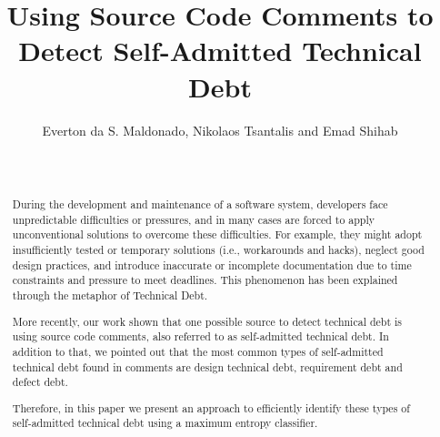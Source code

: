 \documentclass{sig-alternate}
\begin{document}

\title{Using Source Code Comments to Detect Self-Admitted Technical Debt}

\author{
\alignauthor 
       Everton da S. Maldonado, Nikolaos Tsantalis and Emad Shihab\\
       \\
       \\
}


\maketitle
\begin{abstract}
During the development and maintenance of a software system, developers face unpredictable difficulties or pressures, and in many cases are forced to apply unconventional solutions to overcome these difficulties. For example, they might adopt insufficiently tested or temporary solutions (i.e., workarounds and hacks), neglect good design practices, and introduce inaccurate or incomplete documentation due to time constraints and pressure to meet deadlines. This phenomenon has been explained through the metaphor of Technical Debt. 

More recently, our work shown that one possible source to detect technical debt is using source code comments, also referred to as self-admitted technical debt. In addition to that, we pointed out that the most common types of self-admitted technical debt found in comments are design technical debt, requirement debt and defect debt. 

Therefore, in this paper we present an approach to efficiently identify these types of self-admitted technical debt using a maximum entropy classifier. 

\end{abstract}

\terms{}

\keywords{}
\end{document}
